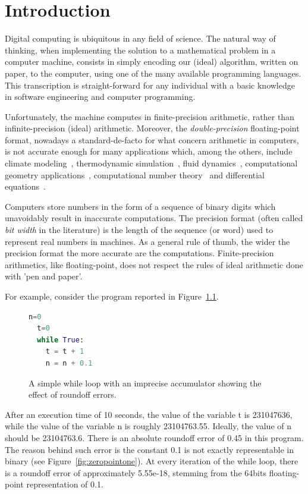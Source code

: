 
\chapter{Introduction}

\setupuuchapterbib
Digital computing is ubiquitous in any field of science.
%
The natural way of thinking, when implementing the solution to a mathematical problem in a computer machine, consists in simply encoding our (ideal) algorithm, written on paper, to the computer, using one of the many available programming languages.
%
This transcription is straight-forward for any individual with a basic knowledge in software engineering and computer programming.
%

Unfortunately, the machine computes in finite-precision arithmetic, rather than infinite-precision (ideal) arithmetic. Moreover, the \emph{double-precision} floating-point format, nowadays a standard-de-facto for what concern arithmetic in computers, is not accurate enough for many applications which, among the others, include climate modeling~\cite{climate}, thermodynamic simulation~\cite{termodynamics}, fluid dynamics~\cite{fluiddynamics, statsfluiddynamics}, computational geometry applications~\cite{javaerror}, computational number theory~\cite{futurescience} and differential equations~\cite{differentialequations}.

%
Computers store numbers in the form of a sequence of binary digits which unavoidably result in inaccurate computations.
%
The precision format (often called \emph{bit width} in the literature) is the length of the sequence (or word) used to represent real numbers in machines.
%
As a general rule of thumb, the wider the precision format the more accurate are the computations.
%
Finite-precision arithmetics, like floating-point, does not respect the rules of ideal arithmetic done with 'pen and paper'. 
%

For example, consider the program reported in Figure~\ref{fig:while}.
%
\begin{figure}[h!]
	\begin{lstlisting}[frame=single, language=Python]
  n=0
  t=0
  while True:
    t = t + 1
    n = n + 0.1
	\end{lstlisting}
	\caption{A simple while loop with an imprecise accumulator showing the effect of roundoff errors.}\label{fig:while}
\end{figure}
%
After an execution time of 10 seconds, the value of the variable t is 231047636, while the value of the variable n is roughly 23104763.55.
%
Ideally, the value of n should be 23104763.6.
%
There is an absolute roundoff error of 0.45 in this program.
%
The reason behind such error is the constant 0.1 is not exactly representable in binary (see Figure~\ref{fig:zeropointone}). 
%
At every iteration of the while loop, there is a roundoff error of approximately 5.55e-18, stemming from the 64bits floating-point representation of 0.1. 
%

